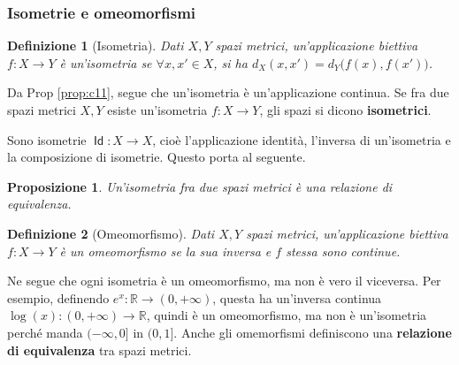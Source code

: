 \documentclass[11pt]{scrartcl}
\theoremstyle{style1}
\newtheorem{prop}{Proposizione}[section]
\newtheorem{definizione}{Definizione}[section]
\numberwithin{equation}{subsection}
\renewcommand{\operatorname}[1]{\mathop{\mathrm{\textsf{#1}}}}
\begin{document}
\subsubsection{Isometrie e omeomorfismi}
\begin{definizione}
	[Isometria]
	Dati $X,Y$ spazi metrici, un'applicazione biettiva $f:X\to Y$ \`e un'isometria se $\forall x,x' \in X$, si ha $d_X(x,x') = d_Y\big(f(x),f(x')\big)$.
\end{definizione}
\noindent Da Prop \ref{prop:c11}, segue che un'isometria \`e un'applicazione continua. Se fra due spazi metrici $X,Y$ esiste un'isometria $f:X\to Y$, gli spazi si dicono \textbf{isometrici}. 

Sono isometrie $\operatorname{Id} : X \to X$, cio\`e l'applicazione identit\`a, l'inversa di un'isometria e la composizione di isometrie. Questo porta al seguente.
\begin{prop}
	Un'isometria fra due spazi metrici \`e una relazione di equivalenza.	
\end{prop}
\begin{definizione}
	[Omeomorfismo]
	Dati $X,Y$ spazi metrici, un'applicazione biettiva $f:X\to Y$ \`e un \textit{omeomorfismo} se la sua inversa e $f$ stessa sono continue.
\end{definizione}
\noindent Ne segue che ogni isometria \`e un omeomorfismo, ma non \`e vero il viceversa. Per esempio, definendo $e^x : \mathbb{R} \to (0,+\infty)$, questa ha un'inversa continua $\log(x) : (0,+\infty) \to \mathbb{R}$, quindi \`e un omeomorfismo, ma non \`e un'isometria perch\'e manda $(-\infty,0]$ in $(0,1]$.
Anche gli omemorfismi definiscono una \textbf{relazione di equivalenza} tra spazi metrici.
\end{document}
